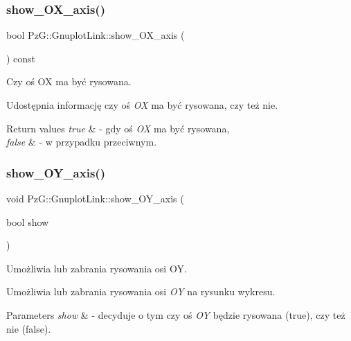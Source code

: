 \subsubsection{\texorpdfstring{show\+\_\+\+O\+X\+\_\+axis()}{show\_OX\_axis()}\hspace{0.1cm}{\footnotesize\ttfamily [2/2]}}
{\footnotesize\ttfamily bool Pz\+G\+::\+Gnuplot\+Link\+::show\+\_\+\+O\+X\+\_\+axis (\begin{DoxyParamCaption}{ }\end{DoxyParamCaption}) const\hspace{0.3cm}{\ttfamily [inline]}}



Czy oś OX ma być rysowana. 

Udostępnia informację czy oś {\itshape OX} ma być rysowana, czy też nie. 
\begin{DoxyRetVals}{Return values}
{\em true} & -\/ gdy oś {\itshape OX} ma być rysowana, \\
\hline
{\em false} & -\/ w przypadku przeciwnym. \\
\hline
\end{DoxyRetVals}
\mbox{\label{class_pz_g_1_1_gnuplot_link_a345cd5f032c34ffcc1e3aa16438dda82}} 
\subsubsection{\texorpdfstring{show\+\_\+\+O\+Y\+\_\+axis()}{show\_OY\_axis()}\hspace{0.1cm}{\footnotesize\ttfamily [1/2]}}
{\footnotesize\ttfamily void Pz\+G\+::\+Gnuplot\+Link\+::show\+\_\+\+O\+Y\+\_\+axis (\begin{DoxyParamCaption}\item[{bool}]{show }\end{DoxyParamCaption})\hspace{0.3cm}{\ttfamily [inline]}}



Umożliwia lub zabrania rysowania osi OY. 

Umożliwia lub zabrania rysowania osi {\itshape OY} na rysunku wykresu. 
\begin{DoxyParams}{Parameters}
{\em show} & -\/ decyduje o tym czy oś {\itshape OY} będzie rysowana ({\ttfamily true}), czy też nie ({\ttfamily false}). \\
\hline
\end{DoxyParams}
\mbox{\label{class_pz_g_1_1_gnuplot_link_a9b1c09293f8128fa970497d2effda7d3}} 
